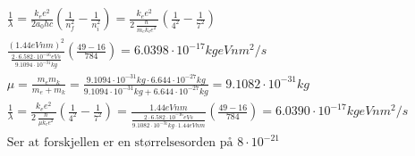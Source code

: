 \documentclass[11pt, A4paper,norsk]{article}
\begin{document}
				\begin{gather*}
\frac{1}{\lambda} = \frac{k_e e^2}{2 a_0 h c} \left( \frac{1}{n_f^2} - \frac{1}{n_i^2} \right) = \frac{k_e e^2}{2 \frac{\hslash}{m_e k_e e^2}} \left( \frac{1}{4^2} - \frac{1}{7^2} \right) \\
\frac{(1.44 eV nm)^2}{\frac{2 \cdot 6.582 \cdot 10^{-16} eV s}{9.1094 \cdot 10^{-31} kg}} \left( \frac{49 - 16}{784} \right) = 6.0398 \cdot 10^{-17} kg eV nm^2/s \\
\mu = \frac{m_e m_k}{m_e + m_k} = \frac{9.1094 \cdot 10^{-31} kg \cdot 6.644 \cdot 10^{-27} kg}{9.1094 \cdot 10^{-31} kg + 6.644 \cdot 10^{-27} kg} =  9.1082 \cdot 10^{-31} kg \\
\frac{1}{\lambda} = \frac{k_e e^2}{2 \frac{\hslash}{\mu k_e e^2}} \left( \frac{1}{4^2} - \frac{1}{7^2} \right) = \frac{1.44 eV nm}{\frac{2 \cdot 6.582 \cdot 10^{-16} eV s}{9.1082 \cdot 10^{-31} kg \cdot 1.44 eV nm}} \left( \frac{49 - 16}{784} \right) = 6.0390 \cdot 10^{-17} kg eV nm^2/s \\
\text{Ser at forskjellen er en størrelsesorden på $8 \cdot 10^{-21}$}
				\end{gather*}
\end{document}
